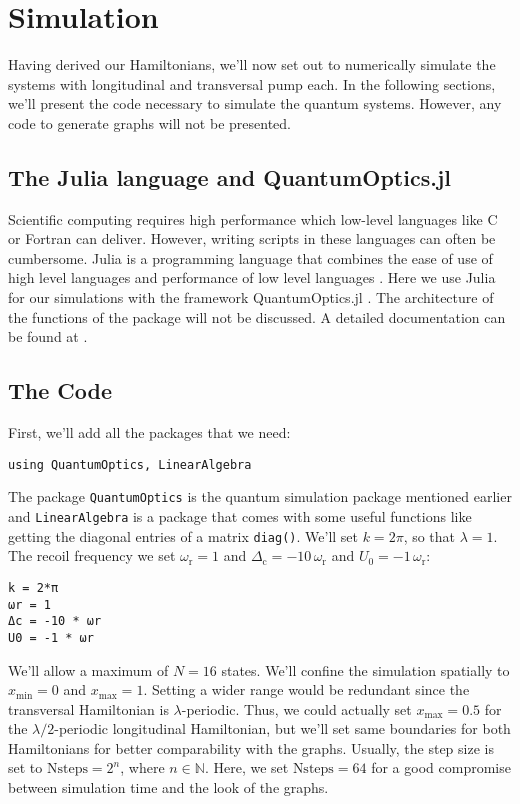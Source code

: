 \section{Simulation}
Having derived our Hamiltonians, we'll now set out to numerically simulate the systems with longitudinal and transversal pump each. In the following sections, we'll present the code necessary to simulate the quantum systems. However, any code to generate graphs will not be presented.

\subsection{The Julia language and QuantumOptics.jl}
Scientific computing requires high performance which low-level languages like C or Fortran can deliver. However, writing scripts in these languages can often be cumbersome. Julia is a programming language that combines the ease of use of high level languages and performance of low level languages \cite{julialang}. Here we use Julia for our simulations with the framework QuantumOptics.jl \cite{qojulia}. The architecture of the functions of the package will not be discussed. A detailed documentation can be found at \cite{documentation}.

\subsection{The Code}
First, we'll add all the packages that we need:

\begin{lstlisting}
using QuantumOptics, LinearAlgebra
\end{lstlisting}The package \texttt{QuantumOptics} is the quantum simulation package mentioned earlier and \texttt{LinearAlgebra} is a package that comes with some useful functions like getting the diagonal entries of a matrix \texttt{diag()}. We'll set $k=2\pi$, so that $\lambda=1$. The recoil frequency we set $\omega_\text{r} = 1$ and $\Delta_\text{c} = -10 \, \omega_\text{r}$ and $U_0 = -1 \, \omega_\text{r}$:

\begin{lstlisting}
k = 2*π
ωr = 1
Δc = -10 * ωr
U0 = -1 * ωr
\end{lstlisting}We'll allow a maximum of $N = 16$ states. We'll confine the simulation spatially to $x_\text{min} = 0$ and $x_\text{max} = 1$. Setting a wider range would be redundant since the transversal Hamiltonian is $\lambda$-periodic. Thus, we could actually set $x_\text{max} = 0.5$ for the $\lambda/2$-periodic longitudinal Hamiltonian, but we'll set same boundaries for both Hamiltonians for better comparability with the graphs. Usually, the step size is set to $\text{Nsteps} = 2^n$, where $n \in \mathbb{N}$. Here, we set $\text{Nsteps} = 64$ for a good compromise between simulation time and the look of the graphs.

